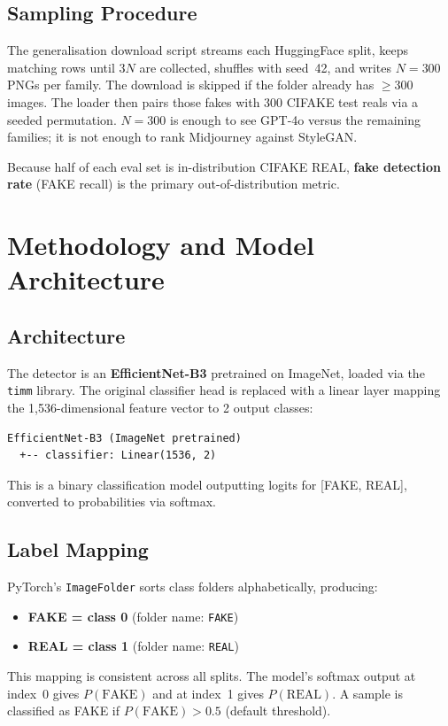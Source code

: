 \documentclass[12pt,a4paper]{article}
\begin{document}
\subsection{Sampling Procedure}
\label{sec:sampling}

The generalisation download script streams each HuggingFace split, keeps matching rows until $3N$ are collected, shuffles with seed~42, and writes $N=300$ PNGs per family. The download is skipped if the folder already has $\geq 300$ images. The loader then pairs those fakes with 300 CIFAKE test reals via a seeded permutation. $N=300$ is enough to see GPT-4o versus the remaining families; it is not enough to rank Midjourney against StyleGAN.

Because half of each eval set is in-distribution CIFAKE REAL, \textbf{fake detection rate} (FAKE recall) is the primary out-of-distribution metric.

\section{Methodology and Model Architecture}

\subsection{Architecture}

The detector is an \textbf{EfficientNet-B3} pretrained on ImageNet, loaded via the \texttt{timm} library. The original classifier head is replaced with a linear layer mapping the 1,536-dimensional feature vector to 2 output classes:

\begin{verbatim}
EfficientNet-B3 (ImageNet pretrained)
  +-- classifier: Linear(1536, 2)
\end{verbatim}

This is a binary classification model outputting logits for [FAKE, REAL], converted to probabilities via softmax.

\subsection{Label Mapping}

PyTorch's \texttt{ImageFolder} sorts class folders alphabetically, producing:
\begin{itemize}[noitemsep]
    \item \textbf{FAKE = class 0} (folder name: \texttt{FAKE})
    \item \textbf{REAL = class 1} (folder name: \texttt{REAL})
\end{itemize}
This mapping is consistent across all splits. The model's softmax output at index~0 gives $P(\text{FAKE})$ and at index~1 gives $P(\text{REAL})$. A sample is classified as FAKE if $P(\text{FAKE}) > 0.5$ (default threshold).
\end{document}

